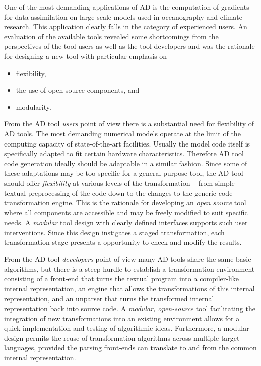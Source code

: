\documentclass{book}
\begin{document}
One of the most demanding applications of AD is the computation of gradients for 
data assimilation on large-scale models used in oceanography and climate research. 
This application clearly falls in the category of experienced users.
An evaluation of the available tools revealed some shortcomings from the perspectives 
of the tool users as well as the tool developers and was the rationale for 
designing a new tool with particular emphasis on   
\begin{itemize}
\item flexibility,
\item the use of open source components, and 
\item modularity.
\end{itemize} 
From  the AD tool  {\em users} point of view there is a substantial need for   
flexibility of AD tools. 
The most demanding  numerical models 
operate at the limit of the computing capacity of state-of-the-art facilities. 
Usually the model code itself is specifically adapted to fit certain 
hardware characteristics. 
Therefore AD tool code generation ideally should be adaptable in a similar fashion. 
Since some of these adaptations may be  too specific for a general-purpose tool,
the AD tool should offer {\em flexibility} at various levels of the 
transformation -- from simple textual preprocessing of the code down to the 
changes to the generic code transformation engine.
This is the rationale for developing an {\em open source} tool where  all
components are accessible  and may be freely modified to suit specific 
needs.  
A {\em modular} tool design with clearly defined interfaces supports such 
user interventions. 
Since this design instigates a staged 
transformation,
each transformation stage presents a opportunity to check and modify the 
results. 

From the AD tool {\em developers} point of view
many AD tools share the same basic algorithms, but
there is a  steep hurdle to establish a transformation environment consisting of
a front-end that turns the textual program into a 
compiler-like internal representation, an engine that allows the 
transformations  of this internal representation, and an unparser that 
turns the transformed internal representation back into source code. 
A {\em modular, open-source} tool facilitating 
the integration of new transformations into an existing environment 
allows for a quick implementation and testing of algorithmic ideas.
Furthermore, a modular design permits the reuse of transformation algorithms 
across multiple target languages, provided the parsing front-ends can translate to and from the 
common internal representation.
\end{document}
